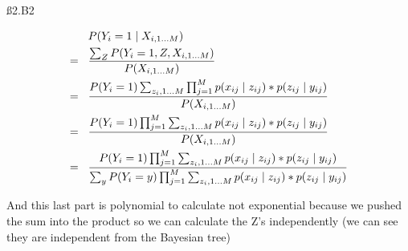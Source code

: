 \ss{2.B2}

\begin{align*}
& P(Y_i=1 \mid X_{i,1\dots M}) \\ = \hspace{3 mm} &
\frac{\sum_Z P(Y_i=1, Z, X_{i,1\dots M})}{P(X_{i,1\dots M})} \\ = \hspace{3 mm} &
\frac{P(Y_i=1) \sum_{z_i,1\dots M} \prod_{j=1}^M p(x_{ij} \mid z_{ij}) * p(z_{ij} \mid y_{ij})}{P(X_{i,1\dots M})} \\ = \hspace{3 mm} &
\frac{P(Y_i=1) \prod_{j=1}^M \sum_{z_i,1\dots M} p(x_{ij} \mid z_{ij}) * p(z_{ij} \mid y_{ij})}{P(X_{i,1\dots M})} \\ = \hspace{3 mm} &
\frac{P(Y_i=1) \prod_{j=1}^M \sum_{z_i,1\dots M} p(x_{ij} \mid z_{ij}) * p(z_{ij} \mid y_{ij})}{\sum_y P(Y_i=y) \prod_{j=1}^M \sum_{z_i,1\dots M} p(x_{ij} \mid z_{ij}) * p(z_{ij} \mid y_{ij})}
\end{align*}

And this last part is polynomial to calculate not exponential because we pushed the sum into the product so we can calculate the Z's independently (we can see they are independent from the Bayesian tree)

